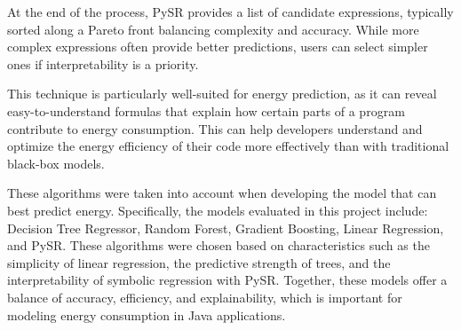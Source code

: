 At the end of the process, PySR provides a list of candidate expressions, typically sorted along a Pareto front balancing complexity and accuracy. While more complex expressions often provide better predictions, users can select simpler ones if interpretability is a priority.

This technique is particularly well-suited for energy prediction, as it can reveal easy-to-understand formulas that explain how certain parts of a program contribute to energy consumption. This can help developers understand and optimize the energy efficiency of their code more effectively than with traditional black-box models.

These algorithms were taken into account when developing the model that can best predict energy.
Specifically, the models evaluated in this project include: Decision Tree Regressor, Random Forest, Gradient Boosting, Linear Regression, and PySR. These algorithms were chosen based on characteristics such as the simplicity of linear regression, the predictive strength of trees, and the interpretability of symbolic regression with PySR. Together, these models offer a balance of accuracy, efficiency, and explainability, which is important for modeling energy consumption in Java applications.


